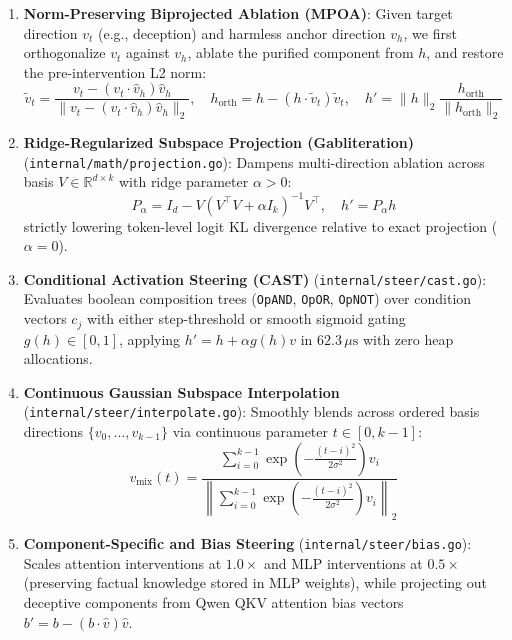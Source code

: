 \documentclass{article}
\begin{document}
\begin{enumerate}
    \item \textbf{Norm-Preserving Biprojected Ablation (MPOA)}: Given target direction $v_t$ (e.g., deception) and harmless anchor direction $v_h$, we first orthogonalize $v_t$ against $v_h$, ablate the purified component from $h$, and restore the pre-intervention L2 norm:
    \begin{equation}
        \tilde{v}_t = \frac{v_t - (v_t \cdot \hat{v}_h)\hat{v}_h}{\|v_t - (v_t \cdot \hat{v}_h)\hat{v}_h\|_2}, \quad h_{\text{orth}} = h - (h \cdot \tilde{v}_t)\tilde{v}_t, \quad h' = \|h\|_2 \frac{h_{\text{orth}}}{\|h_{\text{orth}}\|_2}
    \end{equation}
    \item \textbf{Ridge-Regularized Subspace Projection (Gabliteration)} (\texttt{internal/math/projection.go}): Dampens multi-direction ablation across basis $V \in \mathbb{R}^{d \times k}$ with ridge parameter $\alpha > 0$:
    \begin{equation}
        P_\alpha = I_d - V(V^\top V + \alpha I_k)^{-1}V^\top, \quad h' = P_\alpha h
    \end{equation}
    strictly lowering token-level logit KL divergence relative to exact projection ($\alpha = 0$).
    \item \textbf{Conditional Activation Steering (CAST)} (\texttt{internal/steer/cast.go}): Evaluates boolean composition trees (\texttt{OpAND}, \texttt{OpOR}, \texttt{OpNOT}) over condition vectors $c_j$ with either step-threshold or smooth sigmoid gating $g(h) \in [0, 1]$, applying $h' = h + \alpha g(h) v$ in $62.3\,\mu\text{s}$ with zero heap allocations.
    \item \textbf{Continuous Gaussian Subspace Interpolation} (\texttt{internal/steer/interpolate.go}): Smoothly blends across ordered basis directions $\{v_0, \ldots, v_{k-1}\}$ via continuous parameter $t \in [0, k-1]$:
    \begin{equation}
        v_{\text{mix}}(t) = \frac{\sum_{i=0}^{k-1} \exp\!\left(-\frac{(t - i)^2}{2\sigma^2}\right) v_i}{\left\|\sum_{i=0}^{k-1} \exp\!\left(-\frac{(t - i)^2}{2\sigma^2}\right) v_i\right\|_2}
    \end{equation}
    \item \textbf{Component-Specific and Bias Steering} (\texttt{internal/steer/bias.go}): Scales attention interventions at $1.0\times$ and MLP interventions at $0.5\times$ (preserving factual knowledge stored in MLP weights), while projecting out deceptive components from Qwen QKV attention bias vectors $b' = b - (b \cdot \hat{v})\hat{v}$.

\end{enumerate}
\end{document}
